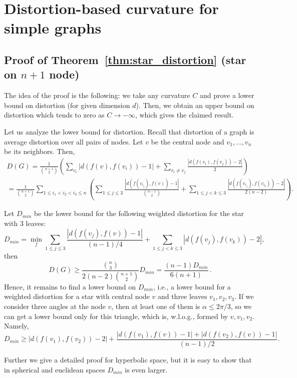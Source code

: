 \documentclass{article} %
\begin{document}
\appendix

\section{Distortion-based curvature for simple graphs}

\subsection{Proof of Theorem~\ref{thm:star_distortion} (star on $n+1$ node)}

The idea of the proof is the following: we take any curvature $C$ and prove a lower bound on distortion (for given dimension $d$). Then, we obtain an upper bound on distortion which tends to zero as $C \to -\infty$, which gives the claimed result.

Let us analyze the lower bound for distortion. Recall that distortion of a graph is average distortion over all pairs of nodes. Let $v$ be the central node and $v_1, \ldots, v_n$ be its neighbors. Then,
\begin{multline*}
D(G) = \frac{1}{\binom{n+1}{2}} \left( \sum_{v_i} {|d(f(v),f(v_i)) - 1|} + \sum_{v_i \neq v_j} \frac{|d(f(v_i),f(v_j)) - 2|}{2} \right) \\
= \frac{1}{\binom{n+1}{2}} \sum_{1 \le i_1 < i_2 < i_3 \le n} \left(
\sum_{1\le j \le 3}  \frac{|d(f(v_{i_j}),f(v)) - 1|}{{n-1 \choose 2}} +
\sum_{1\le j < k\le 3}  \frac{|d(f(v_{i_j}),f(v_{i_k})) - 2|}{2(n-2)}   \right).
\end{multline*}

Let $D_{min}$ be the lower bound for the following weighted distortion for the star with 3 leaves:
\[
D_{min} = \min_{f} \sum_{1\le j \le 3}  \frac{|d(f(v_j),f(v)) - 1|}{(n-1)/4} +
\sum_{1\le j < k\le 3}  |d(f(v_j),f(v_k)) - 2|,
\]
then 
\[
D(G) \ge \frac{{n\choose 3}}{2(n-2){n+1 \choose 2}} D_{min} = \frac{ (n-1)D_{min}}{6(n+1)}\,.
\]
Hence, it remains to find a lower bound on $D_{min}$, i.e., a lower bound for a weighted distortion for a star with central node $v$ and three leaves $v_1, v_2, v_3$.
If we consider three angles at the node $v$, then at least one of them is $\alpha \le 2 \pi / 3$, so we can get a lower bound only for this triangle, which is, w.l.o.g., formed by $v, v_1, v_2$.  Namely,
\[
D_{min} \ge  |d(f(v_1),f(v_2)) - 2| + \frac{|d(f(v_1),f(v)) - 1| + |d(f(v_2),f(v)) - 1|}{(n-1)/2} .
\]


Further we give a detailed proof for hyperbolic space, but it is easy to show that in spherical and euclidean spaces $D_{min}$ is even larger.
\end{document}
